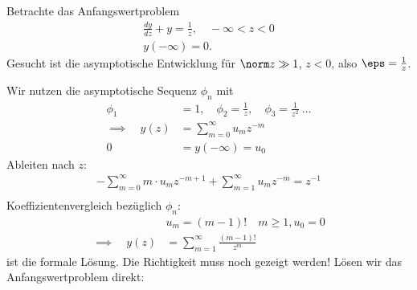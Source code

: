\begin{beispiel}\label{ex:3-4}
  Betrachte das Anfangswertproblem
  \begin{align*}
    \frac{dy}{dz} + y = \frac 1 z, \quad - \infty < z <0\\
    y(- \infty) = 0. 
  \end{align*}
Gesucht ist die asymptotische Entwicklung für $\norm z \gg 1$, $z <0$, also $\eps = \frac 1 z$.  

Wir nutzen die asymptotische Sequenz $\phi_{n}$ mit
\begin{align*}
  \phi_{1} &= 1, \quad \phi_{2} = \frac 1z, \quad \phi_{3} = \frac 1{z^{2}}\ \dots\\
\implies \quad y(z) &= \sum_{m = 0}^{\infty} u_{m} z^{-m}\\
0 &= y(- \infty) = u_{0}
\end{align*}
Ableiten nach $z$: 
\begin{align*}
  -\sum_{m = 0}^{\infty} m\cdot u_{m} z^{-m+1} +\sum_{m = 1}^{\infty} u_{m} z^{-m} = z^{-1}\\
\end{align*}
Koeffizientenvergleich bezüglich $\phi_{n}$:
\begin{align*}
& u_{m} = (m-1)!\quad m\geq 1, u_{0} = 0\\
\implies \quad y(z) &= \sum_{m = 1}^{\infty} \frac{(m-1)!}{z^{m}}
\end{align*}
ist die formale Lösung. Die Richtigkeit muss noch gezeigt werden! Lösen wir das Anfangswertproblem direkt: 


\end{beispiel}
